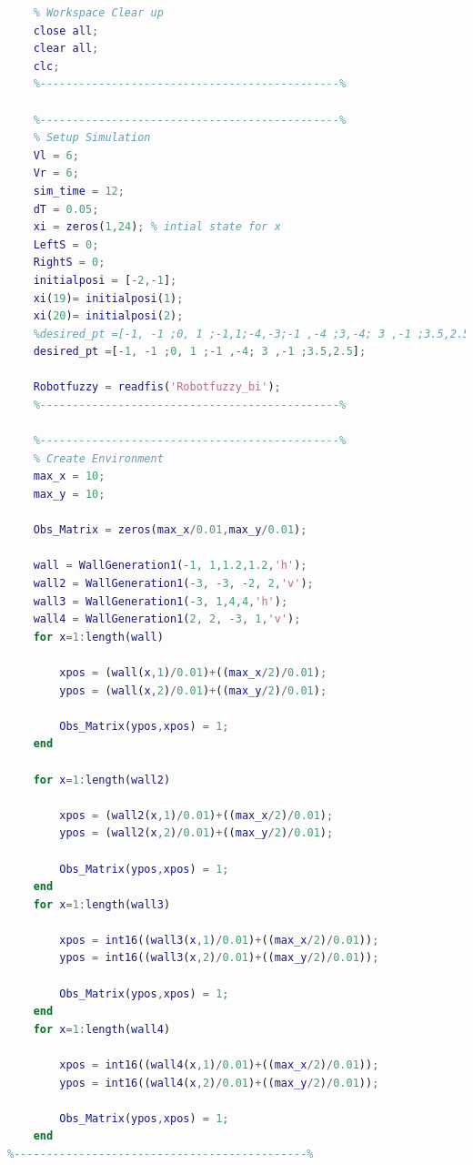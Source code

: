 \documentclass{l4proj}
\begin{document}
\begin{lstlisting}[language=Matlab, float, caption={Task 2 ,Without additional waypoints (Test 1)}, label=lst:callahan]    
     %----------------------------------------------%
    % Workspace Clear up
    close all;
    clear all;
    clc;
    %----------------------------------------------%
    
    %----------------------------------------------%
    % Setup Simulation
    Vl = 6;
    Vr = 6;
    sim_time = 12;
    dT = 0.05;
    xi = zeros(1,24); % intial state for x
    LeftS = 0;
    RightS = 0;
    initialposi = [-2,-1];
    xi(19)= initialposi(1);
    xi(20)= initialposi(2);
    %desired_pt =[-1, -1 ;0, 1 ;-1,1;-4,-3;-1 ,-4 ;3,-4; 3 ,-1 ;3.5,2.5];
    desired_pt =[-1, -1 ;0, 1 ;-1 ,-4; 3 ,-1 ;3.5,2.5];
    
    Robotfuzzy = readfis('Robotfuzzy_bi');
    %----------------------------------------------%
    
    %----------------------------------------------%
    % Create Environment
    max_x = 10;
    max_y = 10;
    
    Obs_Matrix = zeros(max_x/0.01,max_y/0.01);
    
    wall = WallGeneration1(-1, 1,1.2,1.2,'h');
    wall2 = WallGeneration1(-3, -3, -2, 2,'v');
    wall3 = WallGeneration1(-3, 1,4,4,'h');
    wall4 = WallGeneration1(2, 2, -3, 1,'v');
    for x=1:length(wall)
        
        xpos = (wall(x,1)/0.01)+((max_x/2)/0.01);
        ypos = (wall(x,2)/0.01)+((max_y/2)/0.01);
        
        Obs_Matrix(ypos,xpos) = 1;
    end
    
    for x=1:length(wall2)
        
        xpos = (wall2(x,1)/0.01)+((max_x/2)/0.01);
        ypos = (wall2(x,2)/0.01)+((max_y/2)/0.01);
        
        Obs_Matrix(ypos,xpos) = 1;
    end
    for x=1:length(wall3)
        
        xpos = int16((wall3(x,1)/0.01)+((max_x/2)/0.01));
        ypos = int16((wall3(x,2)/0.01)+((max_y/2)/0.01));
        
        Obs_Matrix(ypos,xpos) = 1;
    end
    for x=1:length(wall4)
        
        xpos = int16((wall4(x,1)/0.01)+((max_x/2)/0.01));
        ypos = int16((wall4(x,2)/0.01)+((max_y/2)/0.01));
        
        Obs_Matrix(ypos,xpos) = 1;
    end
%---------------------------------------------%
 \end{lstlisting}
\end{document}
